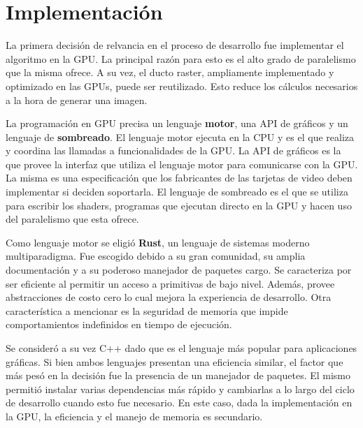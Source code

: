 \graphicspath{{chapters/4_implementación/figures/}}

\chapter{Implementación}\label{chap:implementation}

La primera decisión de relvancia en el proceso de desarrollo fue implementar el algoritmo en la GPU.
La principal razón para esto es el alto grado de paralelismo que la misma ofrece.
A su vez, el ducto raster, ampliamente implementado y optimizado en las GPUs, puede ser reutilizado.
Esto reduce los cálculos necesarios a la hora de generar una imagen.  

La programación en GPU precisa un lenguaje \textbf{motor}, una API de gráficos y un lenguaje de \textbf{sombreado}.
El lenguaje motor ejecuta en la CPU y es el que realiza y coordina las llamadas a funcionalidades de la GPU.
La API de gráficos es la que provee la interfaz que utiliza el lenguaje motor para comunicarse con la GPU.
La misma es una especificación que los fabricantes de las tarjetas de video deben implementar si deciden soportarla.
El lenguaje de sombreado es el que se utiliza para escribir los shaders, programas que ejecutan directo en la GPU y hacen uso del paralelismo que esta ofrece.

Como lenguaje motor se eligió \textbf{Rust}, un lenguaje de sistemas moderno multiparadigma.
Fue escogido debido a su gran comunidad, su amplia documentación y a su poderoso manejador de paquetes cargo.  
Se caracteriza por ser eficiente al permitir un acceso a primitivas de bajo nivel.
Además, provee abstracciones de costo cero lo cual mejora la experiencia de desarrollo.
Otra característica a mencionar es la seguridad de memoria que impide comportamientos indefinidos en tiempo de ejecución.

Se consideró a su vez C++ dado que es el lenguaje más popular para aplicaciones gráficas.  
Si bien ambos lenguajes presentan una eficiencia similar, el factor que más pesó en la decisión fue la presencia de un manejador de paquetes.
El mismo permitió instalar varias dependencias más rápido y cambiarlas a lo largo del ciclo de desarrollo cuando esto fue necesario.
En este caso, dada la implementación en la GPU, la eficiencia y el manejo de memoria es secundario. 

